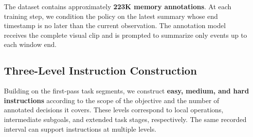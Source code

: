 The dataset contains approximately \textbf{223K memory annotations}. At each training step, we condition the policy on the latest summary whose end timestamp is no later than the current observation. The annotation model receives the complete visual clip and is prompted to summarize only events up to each window end.

\subsection{Three-Level Instruction Construction}
\label{sec:multi-level_supervision}

Building on the first-pass task segments, we construct \textbf{easy, medium, and hard instructions} according to the scope of the objective and the number of annotated decisions it covers. These levels correspond to local operations, intermediate subgoals, and extended task stages, respectively. The same recorded interval can support instructions at multiple levels.

